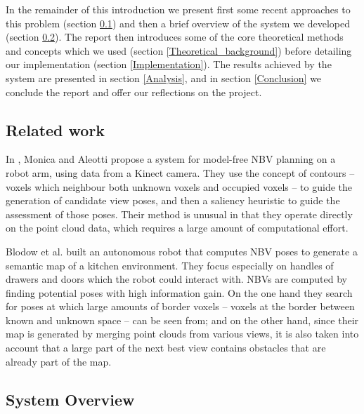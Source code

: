 In the remainder of this introduction we present first some recent approaches to this problem (section \ref{sub:related_work}) and then a brief overview of the system we developed (section \ref{sub:system_overview}).
The report then introduces some of the core theoretical methods and concepts which we used (section \ref{Theoretical_background}) before detailing our implementation (section \ref{Implementation}).
The results achieved by the system are presented in section \ref{Analysis}, and in section \ref{Conclusion} we conclude the report and offer our reflections on the project.

\subsection{Related work}
\label{sub:related_work}

In \cite{monica2017}, Monica and Aleotti propose a system for model-free NBV planning on a robot arm, using data from a Kinect camera.
They use the concept of contours -- voxels which neighbour both unknown voxels and occupied voxels -- to guide the generation of candidate view poses, and then a saliency heuristic to guide the assessment of those poses.
Their method is unusual in that they operate directly on the point cloud data, which requires a large amount of computational effort.

Blodow et al. \cite{blodow2011autonomous} built an autonomous robot that computes NBV poses to generate a semantic map of a kitchen environment.
They focus especially on handles of drawers and doors which the robot could interact with.
NBVs are computed by finding potential poses with high information gain. On the one hand they search for poses at which large amounts of border voxels -- voxels at the border between known and unknown space -- can be seen from; and on the other hand, since their map is generated by merging point clouds from various views, it is also taken into account that a large part of the next best view contains obstacles that are already part of the map.

\subsection{System Overview} %
\label{sub:system_overview}

